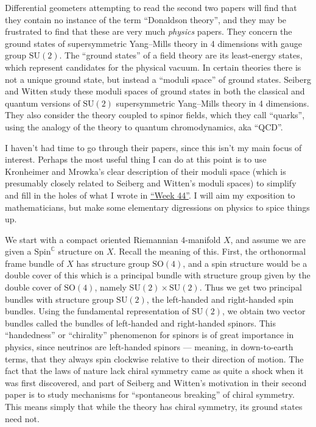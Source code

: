 \documentclass{article}
\begin{document}
Differential geometers attempting to read the second two papers will
find that they contain no instance of the term ``Donaldson theory'', and
they may be frustrated to find that these are very much \emph{physics}
papers. They concern the ground states of supersymmetric Yang--Mills
theory in 4 dimensions with gauge group \(\mathrm{SU}(2)\). The ``ground
states'' of a field theory are its least-energy states, which represent
candidates for the physical vacuum. In certain theories there is not a
unique ground state, but instead a ``moduli space'' of ground states.
Seiberg and Witten study these moduli spaces of ground states in both
the classical and quantum versions of \(\mathrm{SU}(2)\) supersymmetric
Yang--Mills theory in 4 dimensions. They also consider the theory coupled
to spinor fields, which they call ``quarks'', using the analogy of the
theory to quantum chromodynamics, aka ``QCD''.

I haven't had time to go through their papers, since this isn't my main
focus of interest. Perhaps the most useful thing I can do at this point
is to use Kronheimer and Mrowka's clear description of their moduli
space (which is presumably closely related to Seiberg and Witten's
moduli spaces) to simplify and fill in the holes of what I wrote in
\protect\hyperlink{week44}{``Week 44''}. I will aim my exposition to
mathematicians, but make some elementary digressions on physics to spice
things up.

We start with a compact oriented Riemannian 4-manifold \(X\), and assume
we are given a $\mathrm{Spin}^\mathbb{C}$ structure on \(X\). Recall the meaning of this.
First, the orthonormal frame bundle of \(X\) has structure group
\(\mathrm{SO}(4)\), and a spin structure would be a double cover of this
which is a principal bundle with structure group given by the double
cover of \(\mathrm{SO}(4)\), namely
\(\mathrm{SU}(2) \times \mathrm{SU}(2)\). Thus we get two principal
bundles with structure group \(\mathrm{SU}(2)\), the left-handed and
right-handed spin bundles. Using the fundamental representation of
\(\mathrm{SU}(2)\), we obtain two vector bundles called the bundles of
left-handed and right-handed spinors. This ``handedness'' or
``chirality'' phenomenon for spinors is of great importance in physics,
since neutrinos are left-handed spinors --- meaning, in down-to-earth
terms, that they always spin clockwise relative to their direction of
motion. The fact that the laws of nature lack chiral symmetry came as
quite a shock when it was first discovered, and part of Seiberg and
Witten's motivation in their second paper is to study mechanisms for
``spontaneous breaking'' of chiral symmetry. This means simply that
while the theory has chiral symmetry, its ground states need not.
\end{document}
